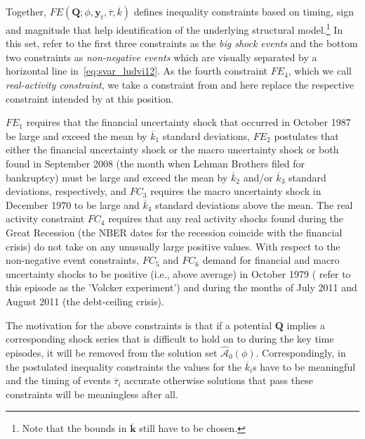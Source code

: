 \documentclass[a4paper,11pt,listof=nochaptergap,oneside,pointednumbers,bibtotoc,bigheadings,liststotoc,hidelinks]{scrbook}
\theoremstyle{mysatz}
\theoremstyle{mydefinition}
\theoremstyle{mytheorem}
\theoremstyle{mybemerkung}
\let\oldhat\hat
\newcommand{\vect}[1]{\boldsymbol{\mathbf{#1}}}
\newcommand{\hatt}[1]{\oldhat{\boldsymbol{\mathbf{#1}}}}
\begin{document}
 Together, $FE(\vect{Q}; \phi, \vect{y}_t, \overline{\tau}, \overline{k})$ defines inequality constraints based on timing, sign and magnitude that help identification of the underlying structural model.\footnote{Note that the bounds in $\overline{\vect{k}}$ still have to be chosen.} In this set, \citet{ludvigsonetal:19} refer to the first three constraints as the \textit{big shock events} and the bottom two constraints as \textit{non-negative events} which are visually separated by a horizontal line in~\ref{eq:svar_ludvi12}. As the fourth constraint $FE_4$, which we call \textit{real-activity constraint}, we take a constraint from \citet{ludvigsonetal:18} and here replace the respective constraint intended by \citet{ludvigsonetal:19} at this position. 

$FE_1$ requires that the financial uncertainty shock that occurred in October 1987 be large and exceed the mean by $\overline{k}_1$ standard deviations, $FE_2$ postulates that either the financial uncertainty shock or the macro uncertainty shock or both found in September 2008 (the month when Lehman Brothers filed for bankruptcy) must be large and exceed the mean by $\overline{k}_2$ and/or $\overline{k}_3$ standard deviations, respectively, and $FC_3$ requires the macro uncertainty shock in December 1970 to be large and $\overline{k}_4$ standard deviations above the mean. The real activity constraint $FC_4$ requires that any real activity shocks found during the Great Recession (the NBER dates for the recession coincide with the financial crisis) do not take on any unusually large positive values. With respect to the non-negative event constraints, $FC_5$ and $FC_6$ demand for financial and macro uncertainty shocks to be positive (i.e., above average) in October 1979 (\citet{ludvigsonetal:19} refer to this episode as the 'Volcker experiment') and during the months of July 2011 and August 2011 (the debt-ceiling crisis).

The motivation for the above constraints is that if a potential $\vect{Q}$ implies a corresponding shock series that is difficult to hold on to during the key time episodes, it will be removed from the solution set $\hatt{\mathcal{A}}_0(\phi)$. Correspondingly, in the postulated inequality constraints the values for the $\overline{k}_i$s have to be meaningful and the timing of events $\overline{\tau}_i$ accurate otherwise solutions that pass these constraints will be meaningless after all.
\end{document}
